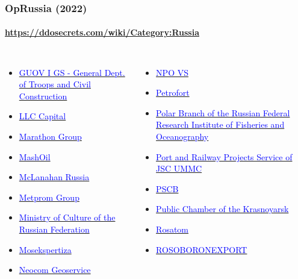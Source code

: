 \documentclass[aspectratio=169,usenames,dvipsnames]{beamer}
\begin{document}
\begin{frame}[t]
  \frametitle{OpRussia (2022)}
  \framesubtitle{\url{https://ddosecrets.com/wiki/Category:Russia}}

  \begin{columns}[T]
    \footnotesize
    \begin{itemize}
      \item \href{https://ddosecrets.com/wiki/GUOV_I_GS_-_General_Dept._of_Troops_and_Civil_Construction}{\textcolor{blue}{GUOV I GS - General Dept. of Troops and Civil Construction}}
      \item \href{https://ddosecrets.com/wiki/LLC_Capital}{\textcolor{blue}{LLC Capital}}
      \item \href{https://ddosecrets.com/wiki/Marathon_Group}{\textcolor{blue}{Marathon Group}}
      \item \href{https://ddosecrets.com/wiki/MashOil}{\textcolor{blue}{MashOil}}
      \item \href{https://ddosecrets.com/wiki/McLanahan_Russia}{\textcolor{blue}{McLanahan Russia}}
      \item \href{https://ddosecrets.com/wiki/Metprom_Group}{\textcolor{blue}{Metprom Group}}
      \item \href{https://ddosecrets.com/wiki/Ministry_of_Culture_of_the_Russian_Federation}{\textcolor{blue}{Ministry of Culture of the Russian Federation}}
      \item \href{https://ddosecrets.com/wiki/Mosekspertiza}{\textcolor{blue}{Mosekspertiza}}
      \item \href{https://ddosecrets.com/wiki/Neocom_Geoservice}{\textcolor{blue}{Neocom Geoservice}}
    \end{itemize}
    \begin{itemize}
      \item \href{https://ddosecrets.com/wiki/NPO_VS}{\textcolor{blue}{NPO VS}}
      \item \href{https://ddosecrets.com/wiki/Petrofort}{\textcolor{blue}{Petrofort}}
      \item \href{https://ddosecrets.com/wiki/Polar_Branch_of_the_Russian_Federal_Research_Institute_of_Fisheries_and_Oceanography}{\textcolor{blue}{Polar Branch of the Russian Federal Research Institute of Fisheries and Oceanography}}
      \item \href{https://ddosecrets.com/wiki/Port_and_Railway_Projects_Service_of_JSC_UMMC}{\textcolor{blue}{Port and Railway Projects Service of JSC UMMC}}
      \item \href{https://ddosecrets.com/wiki/PSCB}{\textcolor{blue}{PSCB}}
      \item \href{https://ddosecrets.com/wiki/Public_Chamber_of_the_Krasnoyarsk}{\textcolor{blue}{Public Chamber of the Krasnoyarsk}}
      \item \href{https://ddosecrets.com/wiki/Rosatom}{\textcolor{blue}{Rosatom}}
      \item \href{https://ddosecrets.com/wiki/ROSOBORONEXPORT}{\textcolor{blue}{ROSOBORONEXPORT}}
    \end{itemize}
  \end{columns}
\end{frame}
\end{document}

